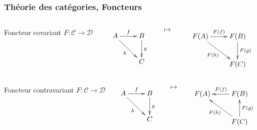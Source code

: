 \documentclass[10pt,draft]{beamer}
\newcommand{\cat}[1]{\mathscr{#1}}
\newcommand{\C}{\cat{C}}
\newcommand{\D}{\cat{D}}
\newcommand{\ra}{\rightarrow}
\begin{document}
\begin{frame}
  \frametitle{Théorie des catégories, Foncteurs}
  
  \begin{columns}
    \begin{column}{0.3\textwidth}
      Foncteur covariant $F:\C\ra\D$
    \end{column}

    \begin{column}{0.25\textwidth}
      \begin{equation*}
        \xymatrix{
          A \ar[r]^f \ar[dr]_{h} & B \ar[d]^g \\
          & C
        }
      \end{equation*}
    \end{column}
    \begin{column}{0.05\textwidth}
      $\mapsto$
    \end{column}
    \begin{column}{0.35\textwidth}
      \begin{equation*}
        \xymatrix{
          F(A) \ar[r]^{F(f)} \ar[dr]_{F(h)} & F(B) \ar[d]^{F(g)} \\
          & F(C)
        }    
      \end{equation*}
    \end{column}
  \end{columns}

  \begin{columns}
    \begin{column}{0.3\textwidth}
      Foncteur contravariant $F:\C\ra\D$
    \end{column}

    \begin{column}{0.25\textwidth}
      \begin{equation*}
        \xymatrix{
          A \ar[r]^f \ar[dr]_{h} & B \ar[d]^g \\
          & C
        }
      \end{equation*}
    \end{column}
    \begin{column}{0.05\textwidth}
      $\mapsto$
    \end{column}
    \begin{column}{0.35\textwidth}
      \begin{equation*}
        \xymatrix{
          F(A) & F(B) \ar[l]_{F(f)} \\
          & F(C) \ar[u]_{F(g)} \ar[ul]^{F(h)}
        }    
      \end{equation*}
    \end{column}
  \end{columns}


\end{frame}
\end{document}
